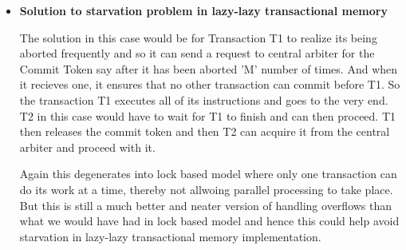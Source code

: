 \documentclass[11pt]{article}
\begin{document}
\begin{itemize}
	\item[] \textbf{Solution to starvation problem in lazy-lazy transactional memory}
	
	The solution in this case would be for Transaction T1 to realize its being aborted frequently and so it can send a request to central arbiter for the Commit Token say after it has been aborted 'M' number of times. And when it recieves one, it ensures that no other transaction can commit before T1. So the transaction T1 executes all of its instructions and goes to the very end. T2 in this case would have to wait for T1 to finish and can then proceed. T1 then releases the commit token and then T2 can acquire it from the central arbiter and proceed with it.
	
	Again this degenerates into lock based model where only one transaction can do its work at a time, thereby not allwoing parallel processing to take place. But this is still a much better and neater version of handling overflows than what we would have had in lock based model  and hence this could help avoid starvation in lazy-lazy transactional memory implementation.  
\end{itemize}
\end{document}
